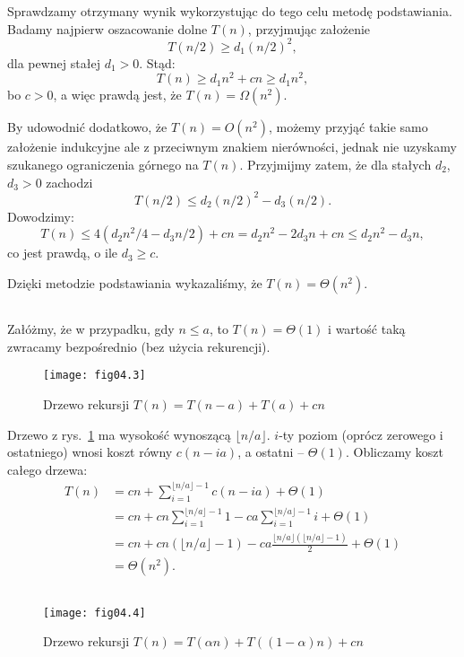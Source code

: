 Sprawdzamy otrzymany wynik wykorzystując do tego celu metodę podstawiania. Badamy najpierw oszacowanie dolne $T(n)$, przyjmując założenie
\[
	T(n/2) \ge d_1(n/2)^2,
\]
dla pewnej stałej $d_1>0$. Stąd:
\[
	T(n) \ge d_1n^2+cn \ge d_1n^2, 
\]
bo $c>0$, a więc prawdą jest, że $T(n)=\Omega(n^2)$.

By udowodnić dodatkowo, że $T(n)=O(n^2)$, możemy przyjąć takie samo założenie indukcyjne ale z przeciwnym znakiem nierówności, jednak nie uzyskamy szukanego ograniczenia górnego na $T(n)$. Przyjmijmy zatem, że dla stałych $d_2$,~$d_3>0$ zachodzi
\[
	T(n/2) \le d_2(n/2)^2-d_3(n/2).
\]
Dowodzimy:
\[
	T(n) \le 4(d_2n^2\!/4-d_3n/2)+cn = d_2n^2-2d_3n+cn \le d_2n^2-d_3n,
\]
co jest prawdą, o ile $d_3\ge c$.

Dzięki metodzie podstawiania wykazaliśmy, że $T(n)=\Theta(n^2)$.

\subsection{} %
Załóżmy, że w przypadku, gdy $n\le a$, to $T(n)=\Theta(1)$ i wartość taką zwracamy bezpośrednio (bez użycia rekurencji).
\begin{figure}[ht]
	\begin{center}
		\texttt{[image: fig04.3]}
	\end{center}
	\caption{Drzewo rekursji $T(n)=T(n-a)+T(a)+cn$} \label{fig:4.2-4}
\end{figure}
Drzewo z rys.~\ref{fig:4.2-4} ma wysokość wynoszącą $\lfloor n/a\rfloor$. $i$-ty poziom (oprócz zerowego i ostatniego) wnosi koszt równy $c(n-ia)$, a ostatni -- $\Theta(1)$. Obliczamy koszt całego drzewa:
\begin{align*}
	T(n) &= cn+\sum_{i=1}^{\lfloor n/a\rfloor-1}c(n-ia)+\Theta(1) \\
	&= cn+cn\sum_{i=1}^{\lfloor n/a\rfloor-1}1-ca\sum_{i=1}^{\lfloor n/a\rfloor-1}i+\Theta(1) \\
	&= cn+cn(\lfloor n/a\rfloor-1)-ca\frac{\lfloor n/a\rfloor(\lfloor n/a\rfloor-1)}{2}+\Theta(1) \\
	&= \Theta(n^2).
\end{align*}

\subsection{} %
\begin{figure}[ht]
	\begin{center}
		\texttt{[image: fig04.4]}
	\end{center}
	\caption{Drzewo rekursji $T(n)=T(\alpha n)+T((1-\alpha)n)+cn$} \label{fig:4.2-5}
\end{figure}

